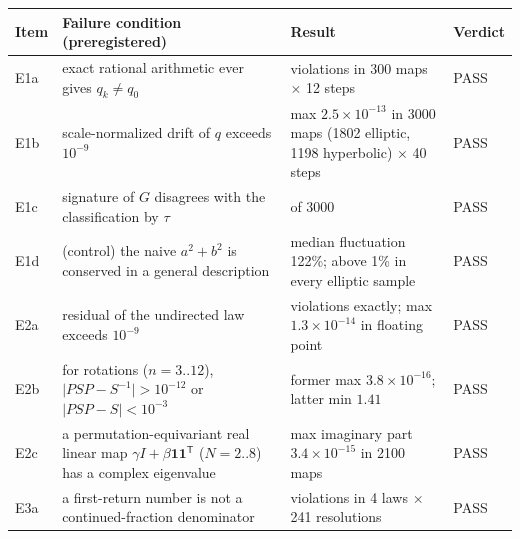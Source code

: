 \documentclass[
  a4paper,
]{article}
\newcounter{none} %
\begin{document}
{\def\LTcaptype{none} %
\begin{longtable}[]{@{}
  >{\raggedright\arraybackslash}p{}
  >{\raggedright\arraybackslash}p{}
  >{\raggedright\arraybackslash}p{}
  >{\raggedright\arraybackslash}p{}@{}}
\toprule\noalign{}
\begin{minipage}[b]{\linewidth}\raggedright
Item
\end{minipage} & \begin{minipage}[b]{\linewidth}\raggedright
Failure condition (preregistered)
\end{minipage} & \begin{minipage}[b]{\linewidth}\raggedright
Result
\end{minipage} & \begin{minipage}[b]{\linewidth}\raggedright
Verdict
\end{minipage} \\
\midrule\noalign{}
\endhead
\bottomrule\noalign{}
\endlastfoot
E1a & exact rational arithmetic ever gives \(q_k\neq q_0\) & 0
violations in 300 maps \(\times\) 12 steps & PASS \\
E1b & scale-normalized drift of \(q\) exceeds \(10^{-9}\) & max
\(2.5\times10^{-13}\) in 3000 maps (1802 elliptic, 1198 hyperbolic)
\(\times\) 40 steps & PASS \\
E1c & signature of \(G\) disagrees with the classification by \(\tau\) &
0 of 3000 & PASS \\
E1d & (control) the naive \(a^2+b^2\) is conserved in a general
description & median fluctuation 122\%; above 1\% in every elliptic
sample & PASS \\
E2a & residual of the undirected law exceeds \(10^{-9}\) & 0 violations
exactly; max \(1.3\times10^{-14}\) in floating point & PASS \\
E2b & for rotations (\(n=3..12\)), \(\lvert PSP-S^{-1}\rvert>10^{-12}\)
or \(\lvert PSP-S\rvert<10^{-3}\) & former max \(3.8\times10^{-16}\);
latter min \(1.41\) & PASS \\
E2c & a permutation-equivariant real linear map
\(\gamma I+\beta\mathbf 1\mathbf 1^{\mathsf T}\) (\(N=2..8\)) has a
complex eigenvalue & max imaginary part \(3.4\times10^{-15}\) in 2100
maps & PASS \\
E3a & a first-return number is not a continued-fraction denominator & 0
violations in 4 laws \(\times\) 241 resolutions & PASS \\

\end{longtable}}
\end{document}
